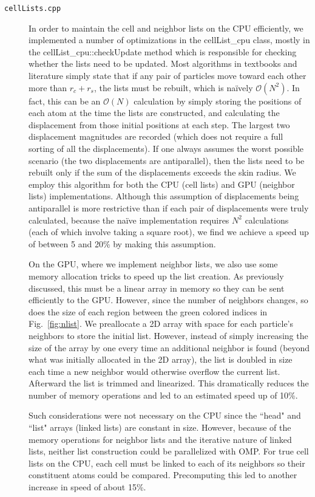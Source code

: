 \documentclass[12pt]{article}
\begin{document}
\begin{description}

\item[\texttt{cellLists.cpp}] In order to maintain the cell and neighbor lists on the CPU efficiently, we implemented a number of optimizations in the cellList\_cpu class, mostly in the cellList\_cpu::checkUpdate method which is responsible for checking whether the lists need to be updated.  Most algorithms in textbooks and literature simply state that if any pair of particles move toward each other more than $r_c + r_s$, the lists must be rebuilt, which is na\"{i}vely $\mathcal{O}(N^2)$.
%
  In fact, this can be an $\mathcal{O}(N)$ calculation by simply storing the positions of each atom at the time the lists are constructed, and calculating the displacement from those initial positions at each step. The largest two displacement magnitudes are recorded (which does not require a full sorting of all the displacements). If one always assumes the worst possible scenario (the two displacements are antiparallel), then the lists need to be rebuilt only if the sum of the displacements exceeds the skin radius.  We employ this algorithm for both the CPU (cell lists) and GPU (neighbor lists) implementations.  Although this assumption of displacements being antiparallel is more restrictive than if each pair of displacements were truly calculated, because the na\"{i}ve implementation requires $N^2$ calculations (each of which involve taking a square root), we find we achieve a speed up of between 5 and 20\% by making this assumption.

On the GPU, where we implement neighbor lists, we also use some memory allocation tricks to speed up the list creation.  As previously discussed, this must be a linear array in memory so they can be sent efficiently to the GPU.  However, since the number of neighbors changes, so does the size of each region between the green colored indices in Fig.~\ref{fig:nlist}. We preallocate a 2D array with space for each particle's neighbors to store the initial list.  However, instead of simply  increasing the size of the array by one every time an additional neighbor is found (beyond what was initially allocated in the 2D array), the list is doubled in size each time a new neighbor would otherwise overflow the current list.  Afterward the list is trimmed and linearized.  This dramatically reduces the number of memory operations and led to an estimated speed up of 10\%.

Such considerations were not necessary on the CPU since the ``head" and ``list" arrays (linked lists) are constant in size.  However, because of the memory operations for neighbor lists and the iterative nature of linked lists, neither list construction could be parallelized with OMP.  For true cell lists on the CPU, each cell must be linked to each of its neighbors so their constituent atoms could be compared.  Precomputing this led to another increase in speed of about 15\%.


\end{description}
\end{document}
